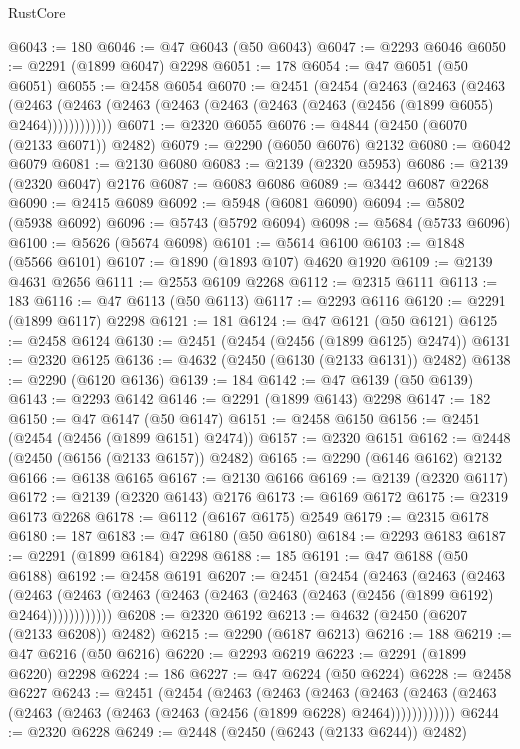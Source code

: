 \begin{lexlean}{RustCore}
\begin{coremodule}
@6043 := 180
@6046 := @47 @6043 (@50 @6043)
@6047 := @2293 @6046
@6050 := @2291 (@1899 @6047) @2298
@6051 := 178
@6054 := @47 @6051 (@50 @6051)
@6055 := @2458 @6054
@6070 := @2451
    (@2454
      (@2463
        (@2463
          (@2463
            (@2463 (@2463 (@2463 (@2463 (@2463 (@2463 (@2463 (@2456 (@1899 @6055) @2464))))))))))))
@6071 := @2320 @6055
@6076 := @4844 (@2450 (@6070 (@2133 @6071)) @2482)
@6079 := @2290 (@6050 @6076) @2132
@6080 := @6042 @6079
@6081 := @2130 @6080
@6083 := @2139 (@2320 @5953)
@6086 := @2139 (@2320 @6047) @2176
@6087 := @6083 @6086
@6089 := @3442 @6087 @2268
@6090 := @2415 @6089
@6092 := @5948 (@6081 @6090)
@6094 := @5802 (@5938 @6092)
@6096 := @5743 (@5792 @6094)
@6098 := @5684 (@5733 @6096)
@6100 := @5626 (@5674 @6098)
@6101 := @5614 @6100
@6103 := @1848 (@5566 @6101)
@6107 := @1890 (@1893 @107) @4620 @1920
@6109 := @2139 @4631 @2656
@6111 := @2553 @6109 @2268
@6112 := @2315 @6111
@6113 := 183
@6116 := @47 @6113 (@50 @6113)
@6117 := @2293 @6116
@6120 := @2291 (@1899 @6117) @2298
@6121 := 181
@6124 := @47 @6121 (@50 @6121)
@6125 := @2458 @6124
@6130 := @2451 (@2454 (@2456 (@1899 @6125) @2474))
@6131 := @2320 @6125
@6136 := @4632 (@2450 (@6130 (@2133 @6131)) @2482)
@6138 := @2290 (@6120 @6136)
@6139 := 184
@6142 := @47 @6139 (@50 @6139)
@6143 := @2293 @6142
@6146 := @2291 (@1899 @6143) @2298
@6147 := 182
@6150 := @47 @6147 (@50 @6147)
@6151 := @2458 @6150
@6156 := @2451 (@2454 (@2456 (@1899 @6151) @2474))
@6157 := @2320 @6151
@6162 := @2448 (@2450 (@6156 (@2133 @6157)) @2482)
@6165 := @2290 (@6146 @6162) @2132
@6166 := @6138 @6165
@6167 := @2130 @6166
@6169 := @2139 (@2320 @6117)
@6172 := @2139 (@2320 @6143) @2176
@6173 := @6169 @6172
@6175 := @2319 @6173 @2268
@6178 := @6112 (@6167 @6175) @2549
@6179 := @2315 @6178
@6180 := 187
@6183 := @47 @6180 (@50 @6180)
@6184 := @2293 @6183
@6187 := @2291 (@1899 @6184) @2298
@6188 := 185
@6191 := @47 @6188 (@50 @6188)
@6192 := @2458 @6191
@6207 := @2451
    (@2454
      (@2463
        (@2463
          (@2463
            (@2463 (@2463 (@2463 (@2463 (@2463 (@2463 (@2463 (@2456 (@1899 @6192) @2464))))))))))))
@6208 := @2320 @6192
@6213 := @4632 (@2450 (@6207 (@2133 @6208)) @2482)
@6215 := @2290 (@6187 @6213)
@6216 := 188
@6219 := @47 @6216 (@50 @6216)
@6220 := @2293 @6219
@6223 := @2291 (@1899 @6220) @2298
@6224 := 186
@6227 := @47 @6224 (@50 @6224)
@6228 := @2458 @6227
@6243 := @2451
    (@2454
      (@2463
        (@2463
          (@2463
            (@2463 (@2463 (@2463 (@2463 (@2463 (@2463 (@2463 (@2456 (@1899 @6228) @2464))))))))))))
@6244 := @2320 @6228
@6249 := @2448 (@2450 (@6243 (@2133 @6244)) @2482)

\end{coremodule}
\end{lexlean}
